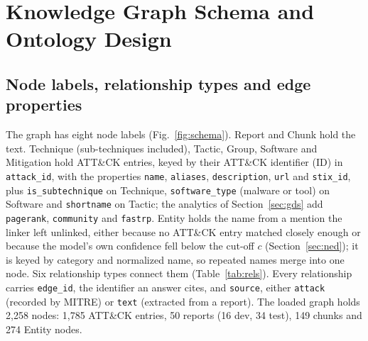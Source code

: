 \documentclass[conference,letterpaper]{IEEEtran}
\newcommand{\code}[1]{\texttt{#1}}
\begin{document}
\section{Knowledge Graph Schema and Ontology Design}\label{sec:schema}
\subsection{Node labels, relationship types and edge properties}
The graph has eight node labels (Fig.~\ref{fig:schema}). Report and Chunk hold the text. Technique (sub-techniques included), Tactic, Group, Software and Mitigation hold ATT\&CK entries, keyed by their ATT\&CK identifier (ID) in \code{attack\_id}, with the properties \code{name}, \code{aliases}, \code{description}, \code{url} and \code{stix\_id}, plus \code{is\_subtechnique} on Technique, \code{software\_type} (malware or tool) on Software and \code{shortname} on Tactic; the analytics of Section~\ref{sec:gds} add \code{pagerank}, \code{community} and \code{fastrp}. Entity holds the name from a mention the linker left unlinked, either because no ATT\&CK entry matched closely enough or because the model's own confidence fell below the cut-off $c$ (Section~\ref{sec:ned}); it is keyed by category and normalized name, so repeated names merge into one node. Six relationship types connect them (Table~\ref{tab:rels}). Every relationship carries \code{edge\_id}, the identifier an answer cites, and \code{source}, either \code{attack} (recorded by MITRE) or \code{text} (extracted from a report). The loaded graph holds 2,258 nodes: 1,785 ATT\&CK entries, 50 reports (16 dev, 34 test), 149 chunks and 274 Entity nodes.
\end{document}
